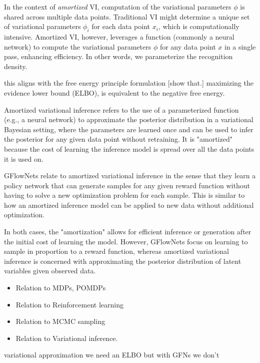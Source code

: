 In the context of \emph{amortized} VI, computation of the variational parameters \( \phi \) is shared across multiple data points. Traditional VI might determine a unique set of variational parameters \( \phi_i \) for each data point \( x_i \), which is computationally intensive. Amortized VI, however, leverages a function (commonly a neural network) to compute the variational parameters \( \phi \) for any data point \( x \) in a single pass, enhancing efficiency. In other words, we parameterize the recognition density. 

this aligns with the free energy principle formulation [show that.]
maximizing the evidence lower bound (ELBO), is equivalent to the negative free energy. 


Amortized variational inference refers to the use of a parameterized function (e.g., a neural network) to approximate the posterior distribution in a variational Bayesian setting, where the parameters are learned once and can be used to infer the posterior for any given data point without retraining. It is "amortized" because the cost of learning the inference model is spread over all the data points it is used on.

GFlowNets relate to amortized variational inference in the sense that they learn a policy network that can generate samples for any given reward function without having to solve a new optimization problem for each sample. This is similar to how an amortized inference model can be applied to new data without additional optimization.

In both cases, the "amortization" allows for efficient inference or generation after the initial cost of learning the model. However, GFlowNets focus on learning to sample in proportion to a reward function, whereas amortized variational inference is concerned with approximating the posterior distribution of latent variables given observed data.





\begin{itemize}
    \item Relation to MDPs, POMDPs
    \item Relation to Reinforcement learning
    \item Relation to MCMC sampling
    \item Relation to Variational inference. 
\end{itemize}


variational approximation we need an ELBO but with GFNs we don't 









